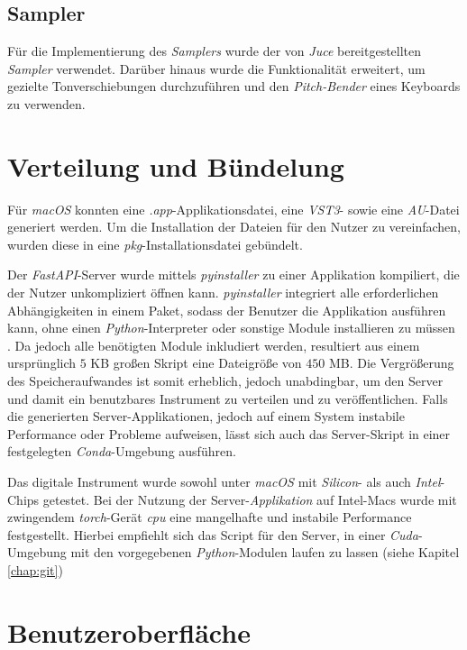 \documentclass[
  a4paper,  %
  twoside,  %
  bibliography=totoc,
  headsepline,
  cleardoublepage=empty,
  parskip=half,
  draft=false
]{scrbook}
\begin{document}
\subsection{Sampler}

Für die Implementierung des \emph{Samplers} wurde der von \emph{Juce} bereitgestellten \emph{Sampler} \cite{noauthor_sampler_nodate} verwendet. Darüber hinaus wurde die Funktionalität erweitert, um gezielte Tonverschiebungen durchzuführen und den \emph{Pitch-Bender} eines Keyboards zu verwenden.

\section{Verteilung und Bündelung}

Für \emph{macOS} konnten eine \emph{.app}-Applikationsdatei, eine \emph{VST3}- sowie eine \emph{AU}-Datei generiert werden. Um die Installation der Dateien für den Nutzer zu vereinfachen, wurden diese in eine \emph{pkg}-Installationsdatei gebündelt. 

Der \emph{FastAPI}-Server wurde mittels \emph{pyinstaller} \cite{noauthor_pyinstaller_nodate} zu einer Applikation kompiliert, die der Nutzer unkompliziert öffnen kann. \emph{pyinstaller} integriert alle erforderlichen Abhängigkeiten in einem Paket, sodass der Benutzer die Applikation ausführen kann, ohne einen \emph{Python}-Interpreter oder sonstige Module installieren zu müssen \cite{noauthor_pyinstaller_nodate}. Da jedoch alle benötigten Module inkludiert werden, resultiert aus einem ursprünglich $5$ KB großen Skript eine Dateigröße von $450$ MB. Die Vergrößerung des Speicheraufwandes ist somit erheblich, jedoch unabdingbar, um den Server und damit ein benutzbares Instrument zu verteilen und zu veröffentlichen. Falls die generierten Server-Applikationen, jedoch auf einem System instabile Performance oder Probleme aufweisen, lässt sich auch das Server-Skript in einer festgelegten \emph{Conda}-Umgebung ausführen. 

Das digitale Instrument wurde sowohl unter \emph{macOS} mit \emph{Silicon}- als auch \emph{Intel}-Chips getestet. Bei der Nutzung der Server-\emph{Applikation} auf Intel-Macs wurde mit zwingendem \emph{torch}-Gerät \emph{cpu} eine mangelhafte und instabile Performance festgestellt. Hierbei empfiehlt sich das Script für den Server, in einer \emph{Cuda}-Umgebung mit den vorgegebenen \emph{Python}-Modulen laufen zu lassen (siehe Kapitel \ref{chap:git})

\section{Benutzeroberfläche}
\end{document}
